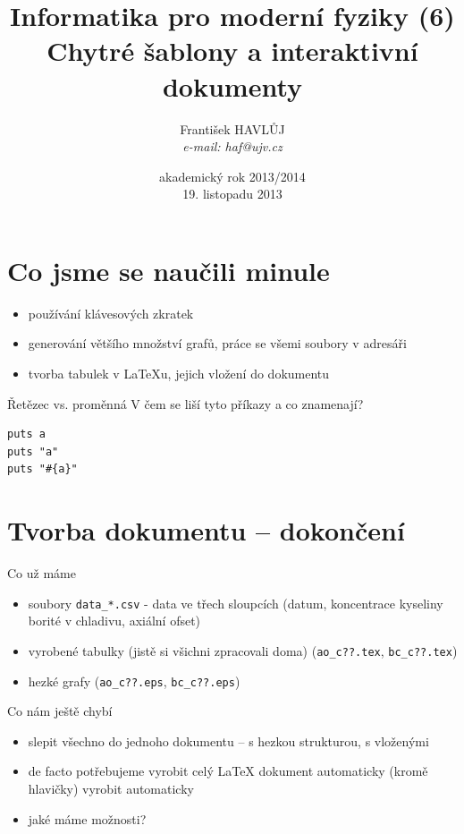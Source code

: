 \documentclass{beamer}
\title[IMF (6)]{Informatika pro moderní fyziky (6)\\ Chytré šablony a interaktivní dokumenty}
\author[Franti\v{s}ek HAVL\r{U}J, ORF ÚJV Řež]{Franti\v{s}ek HAVL\r{U}J\\{\scriptsize \emph{e-mail: haf@ujv.cz}}}
\date{akademický rok 2013/2014\\19. listopadu 2013}
\institute[ORF ÚJV Řež]
{ÚJV Řež\\oddělení Reaktorové fyziky a podpory palivového cyklu}
\begin{document}
\begin{frame}
  \titlepage
\end{frame}

\begin{frame}
  \tableofcontents
\end{frame}

\section{Co jsme se naučili minule}

\begin{frame}{}
  \begin{itemize}
    \item používání klávesových zkratek
    \item generování většího množství grafů, práce se všemi soubory v adresáři
    \item tvorba tabulek v LaTeXu, jejich vložení do dokumentu
  \end{itemize}
\end{frame}

\begin{frame}[fragile]{Řetězec vs. proměnná}
  V čem se liší tyto příkazy a co znamenají?
  \begin{verbatim}
puts a
puts "a"
puts "#{a}"
  \end{verbatim}
\end{frame}

\section{Tvorba dokumentu -- dokončení}

\begin{frame}{Co už máme}
  \begin{itemize}
    \item soubory \texttt{data\_*.csv} - data ve třech sloupcích (datum, koncentrace kyseliny borité v chladivu, axiální ofset)
    \item vyrobené tabulky (jistě si všichni zpracovali doma) (\texttt{ao\_c??.tex}, \texttt{bc\_c??.tex})
    \item hezké grafy (\texttt{ao\_c??.eps}, \texttt{bc\_c??.eps})
  \end{itemize}
\end{frame}

\begin{frame}{Co nám ještě chybí}
  \begin{itemize}
    \item slepit všechno do jednoho dokumentu -- s hezkou strukturou, s vloženými
    \item de facto potřebujeme vyrobit celý LaTeX dokument automaticky (kromě hlavičky) vyrobit automaticky
    \item jaké máme možnosti?
  \end{itemize}
\end{frame}
\end{document}

